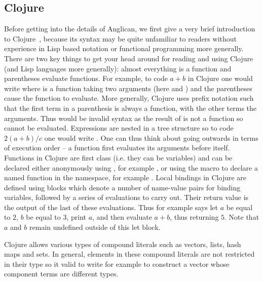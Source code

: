 \subsection{Clojure}
\label{sec:probprog:anglican:clojure} 

Before getting into the details of Anglican, we first give a very brief introduction to Clojure~\citep{hickey2008clojure},
because its syntax may be quite unfamiliar to readers without experience in Lisp based notation or functional programming
more generally.  There are two key things to get your head around for reading and using Clojure (and Lisp languages more
generally): almost everything is a function and parentheses evaluate functions.  For example, to code $a+b$ in Clojure one
would write {\small {}} where \clj{+} is a function taking two arguments (here  and ) and the parentheses cause the
function to evaluate.  More generally, Clojure uses prefix notation such that 
the first term in a parenthesis is always a function, with the other terms the arguments.
Thus {\small {}} would be invalid syntax as the result of {\small {}}  is not a function so cannot be evaluated.
Expressions are nested in a tree structure so to code $2(a+b)/c$ one would write {\small {}}.  One can
thus think about going outwards in terms of execution order -- a function first evaluates its arguments before
itself.  Functions in Clojure are first class (i.e. they can be variables) and can be declared either anonymously using
{\small {}}, for example {\small {}}, or using the
macro  to declare a named function in the namespace, for example {\small {}}.
Local bindings in Clojure are defined using \cllet blocks which denote a number of name-value pairs for
binding variables, followed by a series of evaluations to  carry out. Their return value
is the output of the last of these evaluations.  Thus for example
{\small {}} says let $a$ be equal to $2$, $b$ be equal to $3$, print $a$,
and then evaluate $a+b$, thus returning $5$.  Note that $a$ and $b$ remain undefined outside of this let block.  

Clojure allows various types of compound literals such as vectors, lists, hash maps and sets.
In general, elements in these compound literals are not restricted in
their type so it valid to write for example {\small \lsi{[1 (fn [x] (inc x)) "2"]}} to construct a vector 
whose component terms are different types.

